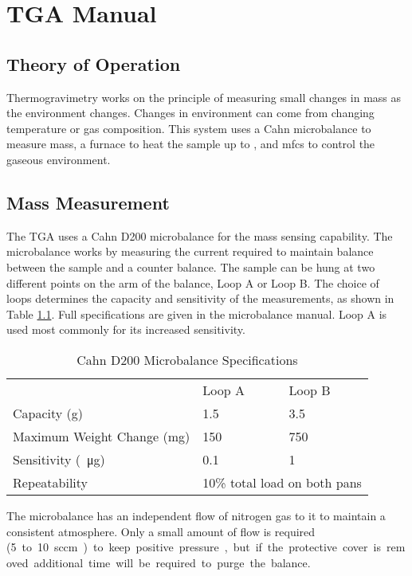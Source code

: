 
\chapter{TGA Manual}
\label{app:TGA}
\section{Theory of Operation}
Thermogravimetry works on the principle of measuring small changes in mass as the environment changes.
Changes in environment can come from changing temperature or gas composition.
This system uses a Cahn microbalance to measure mass, a furnace to heat the sample up to , and \glspl{mfc} to control the gaseous environment.

\section{Mass Measurement}
    The TGA uses a Cahn D200 microbalance for the mass sensing capability.
    The microbalance works by measuring the current required to maintain balance between the sample and a counter balance.
    The sample can be hung at two different points on the arm of the balance, Loop A or Loop B.
    The choice of loops determines the capacity and sensitivity of the measurements, as shown in Table \ref{tab:tga}.
    Full specifications are given in the microbalance manual.
    Loop A is used most commonly for its increased sensitivity.

    \begin{table}
    \centering
    \caption{Cahn D200 Microbalance Specifications}
    \label{tab:tga}
    \begin{tabular}{lll}
                               & Loop A & Loop B                                   \\
    \cline{2-3}
    Capacity (g)               & 1.5    & 3.5                                      \\
    Maximum Weight Change (mg) & 150    & 750                                      \\
    Sensitivity (\SI{}{\micro\gram})           & 0.1    & 1                                        \\
    Repeatability              & \multicolumn{2}{l}{10\% total load on both pans}
    \end{tabular}
    \end{table}

    The microbalance has an independent flow of nitrogen gas to it to maintain a consistent atmosphere.
    Only a small amount of flow is required (\SI{5} to \SI{10}{sccm}) to keep positive pressure, but if the protective cover is removed additional time will be required to purge the balance.

